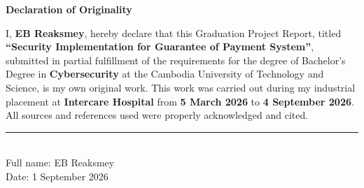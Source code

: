\thispagestyle{empty}

\begin{center}
    {\huge\bfseries Declaration of Originality}
\end{center}
\vspace{1 cm}
I, \textbf{EB Reaksmey}, hereby declare that this Graduation Project Report, titled \textbf{``Security Implementation for Guarantee of Payment System''}, submitted in partial fulfillment of the requirements for the degree of Bachelor's Degree in \textbf{Cybersecurity} at the Cambodia University of Technology and Science, is my own original work. This work was carried out during my industrial placement at \textbf{Intercare Hospital} from \textbf{5 March 2026} to \textbf{4 September 2026}. All sources and references used were properly acknowledged and cited.
\vspace{3cm} %


\noindent\rule{6cm}{0.4pt} \\[0.1cm]
Full name\hspace*{1.05cm}:  EB Reaksmey \\
Date\hspace*{2cm}: 1 September 2026

